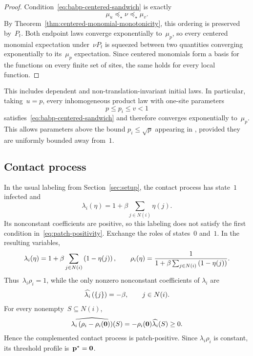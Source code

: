 \documentclass[EJP,preprint,NODS,nobera]{ejpecp}
\begin{document}
\begin{proof}
Condition~\eqref{eq:babp-centered-sandwich} is exactly
\begin{equation*}
\mu_u\preceq_\star\nu\preceq_\star\mu_v.
\end{equation*}
By Theorem~\ref{thm:centered-monomial-monotonicity}, this ordering is preserved
by~$P_t$. Both endpoint laws converge exponentially to~$\mu_p$, so every
centered monomial expectation under~$\nu P_t$ is squeezed between two
quantities converging exponentially to its~$\mu_p$ expectation. Since centered
monomials form a basis for the functions on every finite set of sites, the same
holds for every local function.
\end{proof}

This includes dependent and non-translation-invariant initial laws. In
particular, taking~$u=p$, every inhomogeneous product law with one-site
parameters
\begin{equation*}
p\leq p_i\leq v<1
\end{equation*}
satisfies~\eqref{eq:babp-centered-sandwich} and therefore converges
exponentially to~$\mu_p$. This allows parameters above the bound
$p_i\leq\sqrt p$ appearing in
\cite[Remark~5.5]{MartinelliShapiraToninelli2025}, provided they are uniformly
bounded away from~$1$.

\subsection{Contact process}
\label{subsec:contact-process-applications}

In the usual labeling from Section~\ref{sec:setup}, the contact process has
state~$1$ infected and
\begin{equation*}
\lambda_i(\eta)
=
1+\beta\sum_{j\in N(i)}\eta(j).
\end{equation*}
Its nonconstant coefficients are positive, so this labeling does not satisfy
the first condition in~\eqref{eq:patch-positivity}. Exchange the roles of
states~$0$ and~$1$. In the resulting variables,
\begin{equation*}
\lambda_i(\eta)
=
1+\beta\sum_{j\in N(i)}\left(1-\eta(j)\right),
\qquad
\rho_i(\eta)
=
\frac{1}{1+\beta\sum_{j\in N(i)}\left(1-\eta(j)\right)}.
\end{equation*}
Thus~$\lambda_i\rho_i=1$, while the only nonzero nonconstant coefficients of
$\lambda_i$ are
\begin{equation*}
\widehat{\lambda_i}\left(\left\{j\right\}\right)=-\beta,
\qquad j\in N(i).
\end{equation*}
For every nonempty~$S\subseteq N(i)$,
\begin{equation*}
\widehat{\lambda_i\left(\rho_i-\rho_i(\mathbf{0})\right)}(S)
=
-\rho_i(\mathbf{0})\widehat{\lambda_i}(S)
\geq0.
\end{equation*}
Hence the complemented contact process is patch-positive. Since
$\lambda_i\rho_i$ is constant, its threshold profile is~$\mathbf{p}^\star=\mathbf{0}$.
\end{document}
